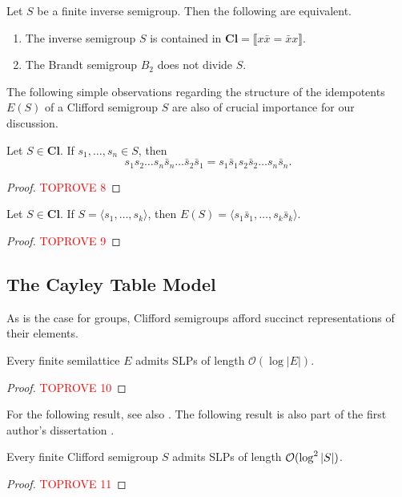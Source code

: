 \documentclass[anonymous,letter,UKenglish,cleveref,autoref,thm-restate]{lipics-v2021}
\newcommand{\abs}[1] {\ensuremath\left|#1\right|}
\newcommand{\vCl}{\ensuremath{\mathbf{Cl}}}
\newcommand{\vId}[1]{\ensuremath{\llbracket #1 \rrbracket}}
\theoremstyle{plain}
\theoremstyle{plain}
\begin{document}
\begin{lemma}\label{lem:characterization-clifford}
  Let $S$ be a finite inverse semigroup.
  Then the following are equivalent.
  \begin{enumerate}
    \item The inverse semigroup $S$ is contained in $\vCl = \vId{x\bar x = \bar x x}$.
    \item The Brandt semigroup $B_2$ does not divide $S$.
  \end{enumerate}
\end{lemma}

The following simple observations regarding the structure of the idempotents $E(S)$ of a Clifford semigroup $S$ are also of crucial importance for our discussion.

\begin{lemma}\label{lem:idempotent_nesting-clifford}
	Let $S \in \vCl$.
	If $s_1, \dotsc, s_n \in S$, then 
	\[
	s_1 s_2 \dotsc s_n \bar s_n \dotsc \bar s_2 \bar s_1 = s_1 \bar s_1 s_2 \bar s_2 \dotsc s_n \bar s_n.
	\]
\end{lemma}
\begin{proof}\textcolor{red}{TOPROVE 8}\end{proof}

\begin{lemma}\label{lem:idempotent_generators-clifford}
	Let $S \in \vCl$.
	If $S = \langle s_1, \dotsc, s_k \rangle$, then $E(S) = \langle s_1 \bar s_1, \dotsc, s_k \bar s_k \rangle$.
\end{lemma}
\begin{proof}\textcolor{red}{TOPROVE 9}\end{proof}


\subsection{The Cayley Table Model}\label{sec:Clifford-CT}

As is the case for groups, Clifford semigroups afford succinct representations of their elements. 

\begin{lemma}\label{lem:semilattice-slp}
	Every finite semilattice $E$ admits SLPs of length $\mathcal{O}(\log {}\lvert E \rvert)$.
\end{lemma}
\begin{proof}\textcolor{red}{TOPROVE 10}\end{proof}
\ifAnonimous For the following result, see also \cite[Lemma 4.10]{Fleischer19diss}.
\else The following result is also part of the first author's dissertation \cite[Lemma 4.10]{Fleischer19diss}.
\fi
\begin{lemma}\label{lem:clifford-slp}
	Every finite Clifford semigroup $S$ admits SLPs of length $\mathcal{O}(\log^2 \abs{S})$.
\end{lemma}
\begin{proof}\textcolor{red}{TOPROVE 11}\end{proof}
\end{document}
